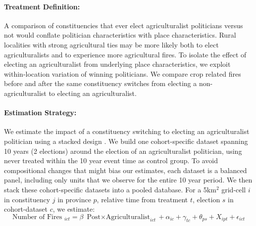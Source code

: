 \documentclass[12pt]{article}
\begin{document}
\paragraph{Treatment Definition:} 
A comparison of constituencies that ever elect agriculturalist politicians versus not would conflate politician characteristics with place characteristics. Rural localities with strong agricultural ties may be more likely both to elect agriculturalists and to experience more agricultural fires. 
To isolate the effect of electing an agriculturalist from underlying place characteristics, we exploit within-location variation of winning politicians.  We compare crop related fires before and after the same constituency switches from electing a non-agriculturalist to electing an agriculturalist. %


\paragraph{Estimation Strategy:}
We estimate the impact of a constituency switching to electing an agriculturalist politician using a stacked design \citep{cengiz2019effect}. We build one cohort-specific dataset spanning 10 years (2 elections) around the election of an agriculturalist politician, using never treated within the 10 year event time as control group. To avoid compositional changes that might bias our estimates, each dataset is a balanced panel, including only units that we observe for the entire 10 year period. We then stack these cohort-specific datasets into a pooled database. For a 5km$^2$ grid-cell $i$ in constituency $j$ in province $p$, relative time from treatment $t$, election $s$ in cohort-dataset $c$, we estimate:
\begin{equation}\label{eq_agriculture}
 { \text{Number of Fires } }_{i c t}=\beta {\text{ Post$\times$Agriculturalist}}_{i c t}+ \alpha_{ic}+ \gamma_{tc} + \theta_{ps}+ X_{ipt} + \epsilon_{i c t}
\end{equation}
\end{document}
